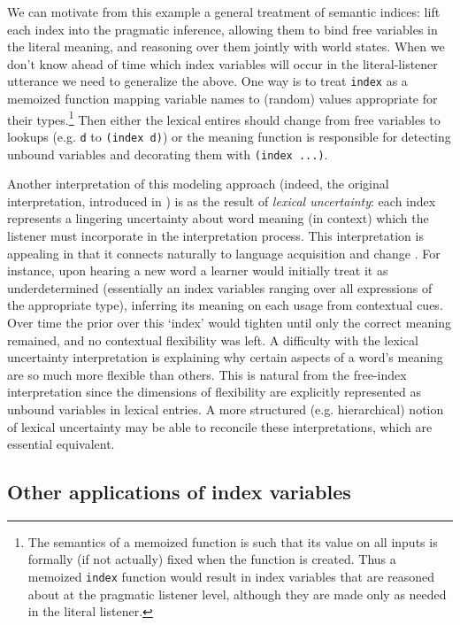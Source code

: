 \documentclass[12pt]{article}
\begin{document}
We can motivate from this example a general treatment of semantic indices: lift each index into the pragmatic inference, allowing them to bind free variables in the literal meaning, and reasoning over them jointly with world states. 
When we don't know ahead of time which index variables will occur in the literal-listener utterance we need to generalize the above. 
One way is to treat \lstinline{index} as a memoized function mapping variable names to (random) values appropriate for their types.\footnote{The semantics of a memoized function is such that its value on all inputs is formally (if not actually) fixed when the function is created. Thus a memoized \lstinline{index} function would result in index variables that are reasoned about at the pragmatic listener level, although they are made only as needed in the literal listener.} 
Then either the lexical entires should change from free variables to lookups (e.g. \lstinline{d} to \lstinline{(index d)}) or the meaning function is responsible for detecting unbound variables and decorating them with \lstinline[mathescape]{(index ...)}.

Another interpretation of this modeling approach (indeed, the original interpretation, introduced in \cite{Bergen2012}) is as the result of \emph{lexical uncertainty}: each index represents a lingering uncertainty about word meaning (in context) which the listener must incorporate in the interpretation process. This interpretation is appealing in that it connects naturally to language acquisition and change \cite{SmithFrankGoodman}. For instance, upon hearing a new word a learner would initially treat it as underdetermined (essentially an index variables ranging over all expressions of the appropriate type), inferring its meaning on each usage from contextual cues. Over time the prior over this `index' would tighten until only the correct meaning remained, and no contextual flexibility was left. A difficulty with the lexical uncertainty interpretation is explaining why certain aspects of a word's meaning are so much more flexible than others. This is natural from the free-index interpretation since the dimensions of flexibility are explicitly represented as unbound variables in lexical entries. A more structured (e.g. hierarchical) notion of lexical uncertainty may be able to reconcile these interpretations, which are essential equivalent.


\subsection{Other applications of index variables}
\end{document}
